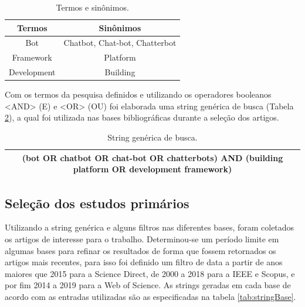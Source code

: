 \begin{table}[H]
    
    \begin{center}
    \begin{tabular}{||c c||} 
    \hline
    Termos & Sinônimos \\ [0.5ex] 
    \hline
    Bot & Chatbot, Chat-bot, Chatterbot   \\ 
    \hline
    Framework & Platform  \\
    \hline
    Development & Building \\
    \hline
    \end{tabular}
    \caption{Termos e sinônimos.}
    \label{tab:termosBusca}
    
    \end{center}
   
\end{table}


Com os termos da pesquisa definidos e utilizando os operadores booleanos <AND> (E) e
<OR> (OU) foi elaborada uma string genérica de busca (Tabela \ref{tab:stringGenerica}), a qual foi utilizada nas bases
bibliográficas durante a seleção dos artigos.

\begin{table}[H]
    
    \begin{center}
    \begin{tabular}{| c |} 
    \hline
    (bot OR chatbot OR chat-bot OR chatterbots) AND (building platform OR development framework) \\ 
    \hline
    \end{tabular}
    \caption{String genérica de busca.}
    \label{tab:stringGenerica}
    
    \end{center}
   
\end{table}


\subsection{Seleção dos estudos primários}

Utilizando a string genérica e alguns filtros nas diferentes bases, foram coletados os
artigos de interesse para o trabalho. Determinou-se um período limite em algumas bases para
refinar os resultados de forma que fossem retornados os artigos mais recentes, para isso foi
definido um filtro de data a partir de anos maiores que 2015 para a Science Direct, de 2000 a
2018 para a IEEE e Scopus, e por fim 2014 a 2019 para a Web of Science.
As strings geradas em cada base de acordo com as entradas utilizadas são as especificadas na
tabela \ref{tab:stringBase}.


